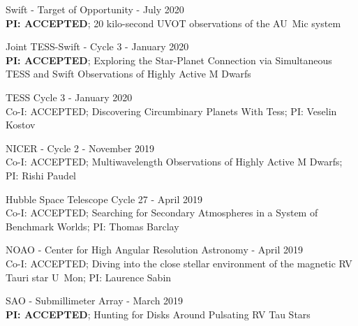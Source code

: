 \documentclass[letter,11pt]{article}
\begin{document}
\begin{etaremune}
\item Swift - Target of Opportunity - July 2020 \\
\textbf{PI: ACCEPTED}; 20 kilo-second UVOT observations of the AU~Mic system

\item Joint TESS-Swift - Cycle 3 - January 2020 \\
\textbf{PI: ACCEPTED}; Exploring the Star-Planet Connection via Simultaneous TESS and Swift Observations of Highly Active M Dwarfs

\item TESS Cycle 3 - January 2020 \\
Co-I: ACCEPTED; Discovering Circumbinary Planets With Tess; PI: Veselin Kostov

\item NICER - Cycle 2 - November 2019 \\
Co-I: ACCEPTED; Multiwavelength Observations of Highly Active M Dwarfs; PI: Rishi Paudel


\item Hubble Space Telescope Cycle 27 - April 2019 \\
Co-I: ACCEPTED; Searching for Secondary Atmospheres in a System of Benchmark Worlds; PI: Thomas Barclay

\item NOAO - Center for High Angular Resolution Astronomy - April 2019\\
Co-I: ACCEPTED; Diving into the close stellar environment of the magnetic
RV Tauri star U~Mon; PI: Laurence Sabin


\item SAO - Submillimeter Array - March 2019 \\
 \textbf{PI: ACCEPTED}; Hunting for Disks Around Pulsating RV Tau Stars


\end{etaremune}
\end{document}
